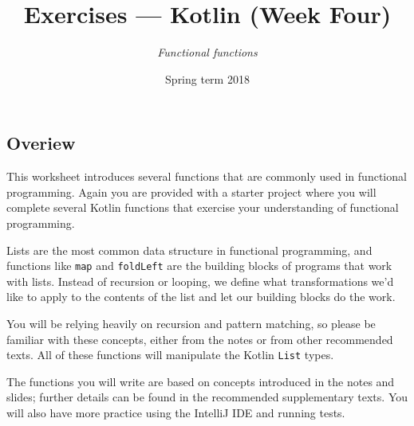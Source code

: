 \documentclass[12pt,a4paper]{exam}
\title{Exercises --- Kotlin (Week Four)}
\author{\emph{Functional functions}}
\date{Spring term 2018}
\begin{document}
\maketitle

\subsection*{Overiew}

\noindent This worksheet introduces several functions that are commonly used in 
functional programming. 
Again you are provided with a starter project where you will complete several Kotlin functions that exercise 
your understanding of functional programming. 

Lists are the most common data structure in functional programming, and functions like \verb!map! and 
\verb!foldLeft! are the building blocks of programs that work with lists. Instead of recursion or looping, 
we define what transformations we’d like to apply to the contents of the list and let 
our building blocks do the work.

You will be relying heavily on recursion and pattern matching, so please be familiar with these concepts, 
either from the notes or from other recommended texts. 
All of these functions will manipulate the Kotlin \verb!List! types.

The functions you will write are based on concepts introduced in the 
notes and slides; further details can be found in the recommended supplementary texts. 
You will also have more practice using the IntelliJ IDE and running tests.
\end{document}
